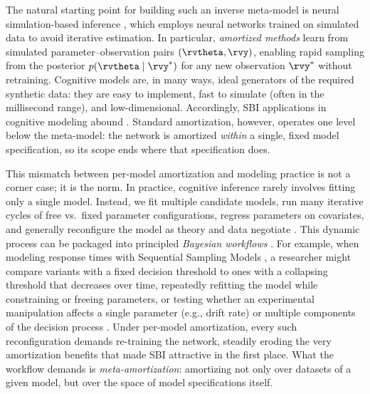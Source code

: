 The natural starting point for building such an inverse meta-model is neural simulation-based inference \citep[SBI;][]{cranmer2020frontier, deistler2025simulation}, which employs neural networks trained on simulated data to avoid iterative estimation. In particular, \textit{amortized methods} \citep{burkner2023some} learn from simulated parameter–observation pairs $(\rvtheta, \rvy)$, enabling rapid sampling from the posterior $p(\rvtheta \mid \rvy^*)$ for any new observation $\rvy^*$ without retraining.
Cognitive models are, in many ways, ideal generators of the required synthetic data: they are easy to implement, fast to simulate (often in the millisecond range), and low-dimensional.
Accordingly, SBI applications in cognitive modeling abound \citep[e.g.,][]{radev2020amortized, wieschen2020jumping, fengler2021likelihood, boelts2022flexible, von2022mental, ghaderi2023general, sokratous2023ask, schumacher2023superstat, schumacher2024validation, rmus2024artificial, hato2025, schaefer2025conflictModels, scholten2026diffusionLens, kvam2024using, kvam2025comparing, belov2026supervised, wu2026testing}.
Standard amortization, however, operates one level below the meta-model: the network is amortized \textit{within} a single, fixed model specification, so its scope ends where that specification does.

This mismatch between per-model amortization and modeling practice is not a corner case; it is the norm.
In practice, cognitive inference rarely involves fitting only a single model.
Instead, we fit multiple candidate models, run many iterative cycles of free vs.~fixed parameter configurations, regress parameters on covariates, and generally reconfigure the model as theory and data negotiate \citep{voss2019sequential, evans2019assessing, stevensonBayesianHierarchical2026}.
This dynamic process can be packaged into principled \textit{Bayesian workflows} \citep{gelman2020bayesian, schad2021toward, li2024amortized}.
For example, when modeling response times with Sequential Sampling Models \citep[SSM;][]{smith2025ssmBible}, a researcher might compare variants with a fixed decision threshold to ones with a collapsing threshold that decreases over time, repeatedly refitting the model while constraining or freeing parameters, or testing whether an experimental manipulation affects a single parameter (e.g., drift rate) or multiple components of the decision process \citep{von2022mental}.
Under per-model amortization, every such reconfiguration demands re-training the network, steadily eroding the very amortization benefits that made SBI attractive in the first place.
What the workflow demands is \textit{meta-amortization}: amortizing not only over datasets of a given model, but over the space of model specifications itself.

